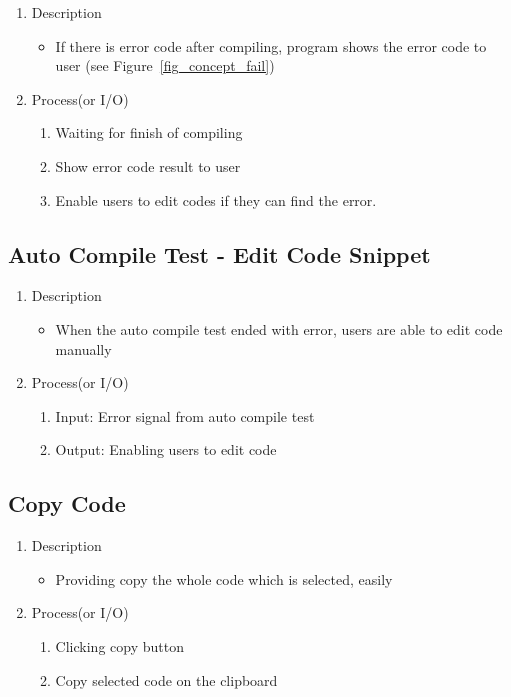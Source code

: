 \documentclass[conference]{IEEEtran}
\begin{document}
\begin{enumerate}
  \item Description
  \begin{itemize}
    \item If there is error code after compiling, program shows the error code to user (see Figure~\ref{fig_concept_fail})
  \end{itemize}
  \item Process(or I/O)
  \begin{enumerate}
    \item Waiting for finish of compiling
    \item Show error code result to user
    \item Enable users to edit codes if they can find the error.
  \end{enumerate}
\end{enumerate}

\textit{}

\subsection{Auto Compile Test - Edit Code Snippet}
\begin{enumerate}
  \item Description
  \begin{itemize}
    \item When the auto compile test ended with error, users are able to edit code manually
  \end{itemize}
  \item Process(or I/O)
  \begin{enumerate}
    \item Input: Error signal from auto compile test
    \item Output: Enabling users to edit code
  \end{enumerate}
\end{enumerate}


\subsection{Copy Code}

\begin{enumerate}
  \item Description
  \begin{itemize}
    \item Providing copy the whole code which is selected, easily
  \end{itemize}
  \item Process(or I/O)
  \begin{enumerate}
    \item Clicking copy button
    \item Copy selected code on the clipboard
  \end{enumerate}
\end{enumerate}
\textit{}
\end{document}
